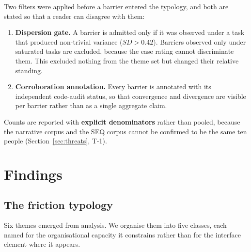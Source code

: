 \documentclass[]{interact}
\theoremstyle{plain}
\begin{document}
Two filters were applied before a barrier entered the typology, and both are stated so that a reader
can disagree with them:

\begin{enumerate}
\item \textbf{Dispersion gate.} A barrier is admitted only if it was observed under a task that
      produced non-trivial variance ($SD > 0.42$). Barriers observed only under saturated tasks are
      excluded, because the ease rating cannot discriminate them. This excluded nothing from the theme
      set but changed their relative standing.
\item \textbf{Corroboration annotation.} Every barrier is annotated with its independent code-audit
      status, so that convergence and divergence are visible per barrier rather than as a single
      aggregate claim.
\end{enumerate}

Counts are reported with \textbf{explicit denominators} rather than pooled, because the narrative
corpus and the SEQ corpus cannot be confirmed to be the same ten people (Section~\ref{sec:threats}, T-1).

\section{Findings}

\subsection{The friction typology}

Six themes emerged from analysis. We organise them into five classes, each named for the organisational
capacity it constrains rather than for the interface element where it appears.
\end{document}
